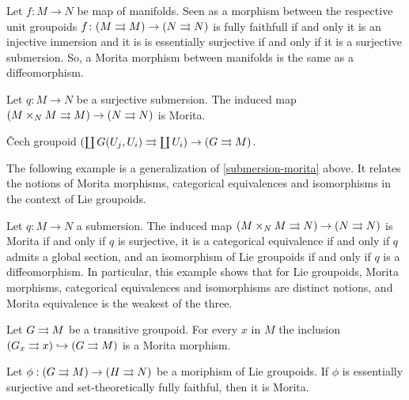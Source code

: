 \begin{example}
Let $f\colon M\to N$ be map of manifolds.
Seen as a morphism between the respective unit groupoids $f\colon (M\rightrightarrows M) \to (N\rightrightarrows N)$ is fully faithfull if and only it is an injective inmersion and it is is essentially surjective if and only if it is a surjective submersion.
So, a Morita morphism between manifolds is the same as a diffeomorphism.
\end{example}

\begin{example}\label{submersion-morita}
Let $q\colon M\to N$ be a surjective submersion.
The induced map $(M\times_N M \rightrightarrows M)\to(N\rightrightarrows N)$ is Morita.
\end{example}

\begin{example}
\v{C}ech groupoid
$\left( \coprod G(U_j,U_i) \rightrightarrows \coprod U_i \right) \to \left( G\rightrightarrows M \right)$.
\end{example}

The following example is a generalization of \ref{submersion-morita} above.
It relates the notions of Morita morphisms, categorical equivalences and isomorphisms in the context of Lie groupoids.

\begin{example}
Let $q\colon M\to N$ a submersion.
The induced map $(M\times_N M\rightrightarrows N)\to (N\rightrightarrows N)$ is Morita if and only if $q$ is surjective, it is a categorical equivalence if and only if $q$ admits a global section, and an isomorphism of Lie groupoids if and only if $q$ is a diffeomorphism.
In particular, this example shows that for Lie groupoids, Morita morphisms, categorical equivalences and isomorphisms are distinct notions, and Morita equivalence is the weakest of the three.
\end{example}

\begin{example}
Let $G\rightrightarrows M$ be a transitive groupoid.
For every $x$ in $M$ the inclusion
$(G_x\rightrightarrows x) \hookrightarrow (G\rightrightarrows M)$
is a Morita morphism.
\end{example}

\begin{lemma}\label{ES-and-stFF}
Let $\phi: (G\rightrightarrows M) \to (H\rightrightarrows N)$ be a moriphism of Lie groupoids.
If $\phi$ is essentially surjective and set-theoretically fully faithful, then it is Morita.
\end{lemma}

